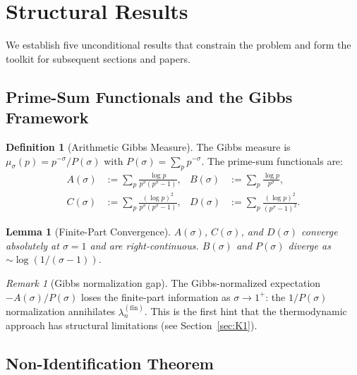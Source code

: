 \documentclass[12pt,a4paper]{article}
\newtheorem{lemma}[theorem]{Lemma}
\theoremstyle{definition}
\newtheorem{definition}[theorem]{Definition}
\theoremstyle{remark}
\newtheorem{remark}[theorem]{Remark}
\newcommand{\muG}{\mu_\sigma}
\begin{document}
\section{Structural Results}
\label{sec:structural}

We establish five unconditional results that constrain the problem and form the toolkit for subsequent sections and papers.

\subsection{Prime-Sum Functionals and the Gibbs Framework}

\begin{definition}[Arithmetic Gibbs Measure]
The Gibbs measure is $\muG(p) = p^{-\sigma}/P(\sigma)$ with $P(\sigma) = \sum_p p^{-\sigma}$. The prime-sum functionals are:
\begin{align*}
A(\sigma) &:= \sum_p \frac{\log p}{p^\sigma(p^\sigma - 1)}, &
B(\sigma) &:= \sum_p \frac{\log p}{p^\sigma},\\
C(\sigma) &:= \sum_p \frac{(\log p)^2}{p^\sigma(p^\sigma - 1)}, &
D(\sigma) &:= \sum_p \frac{(\log p)^2}{(p^\sigma - 1)^2}.
\end{align*}
\end{definition}

\begin{lemma}[Finite-Part Convergence]
\label{lem:convergence}
$A(\sigma)$, $C(\sigma)$, and $D(\sigma)$ converge absolutely at $\sigma = 1$ and are right-continuous. $B(\sigma)$ and $P(\sigma)$ diverge as $\sim\log(1/(\sigma-1))$.
\end{lemma}

\begin{remark}[Gibbs normalization gap]
The Gibbs-normalized expectation $-A(\sigma)/P(\sigma)$ loses the finite-part information as $\sigma \to 1^+$: the $1/P(\sigma)$ normalization annihilates $\lambda_n^{(\mathrm{fin})}$. This is the first hint that the thermodynamic approach has structural limitations (see Section~\ref{sec:K1}).
\end{remark}

\subsection{Non-Identification Theorem}
\end{document}
